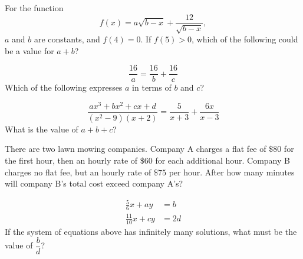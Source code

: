 \noindent\markforreview
\vspace{1em}

For the function
\[
f(x) = a\sqrt{b - x} + \frac{12}{\sqrt{b - x}},
\]
\(a\) and \(b\) are constants, and \(f(4) = 0\). If \(f(5) > 0\), which of the following could be a value for \(a + b\)?

\vspace{0.75em}


\vspace{2em}
\newpage

\noindent\markforreview
\vspace{1em}

\[
\frac{16}{a} = \frac{16}{b} + \frac{16}{c}
\]
Which of the following expresses \(a\) in terms of \(b\) and \(c\)?

\vspace{0.75em}


\vspace{2em}
\newpage

\noindent\markforreview
\vspace{1em}

\[
\frac{ax^3 + bx^2 + cx + d}{(x^2 - 9)(x + 2)} = \frac{5}{x + 3} + \frac{6x}{x - 3}
\]
What is the value of \(a + b + c\)?

\vspace{2em}
\newpage

\noindent\markforreview
\vspace{1em}

There are two lawn mowing companies. Company A charges a flat fee of \(\$80\) for the first hour, then an hourly rate of \(\$60\) for each additional hour. Company B charges no flat fee, but an hourly rate of \(\$75\) per hour. After how many minutes will company B's total cost exceed company A's?

\vspace{2em}
\newpage

\noindent\markforreview
\vspace{1em}

\[
\begin{aligned}
\frac{5}{6}x + ay &= b \\
\frac{11}{10}x + cy &= 2d
\end{aligned}
\]
If the system of equations above has infinitely many solutions, what must be the value of \(\dfrac{b}{d}\)?

